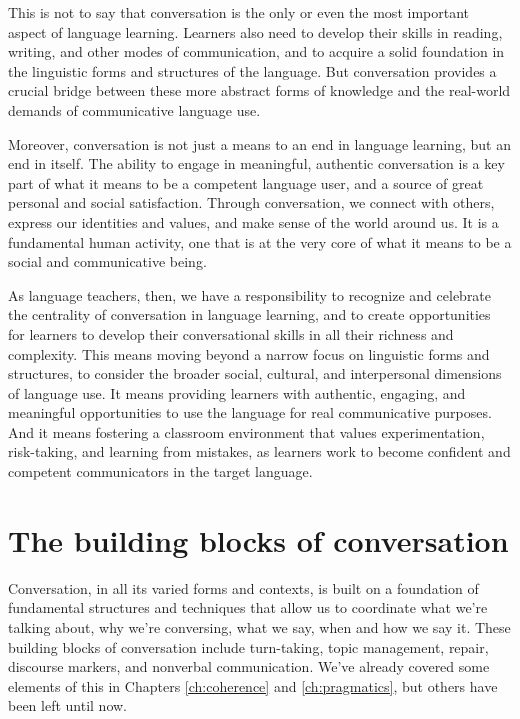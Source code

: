 This is not to say that conversation is the only or even the most important aspect of language learning. Learners also need to develop their skills in reading, writing, and other modes of communication, and to acquire a solid foundation in the linguistic forms and structures of the language. But conversation provides a crucial bridge between these more abstract forms of knowledge and the real-world demands of communicative language use.

Moreover, conversation is not just a means to an end in language learning, but an end in itself. The ability to engage in meaningful, authentic conversation is a key part of what it means to be a competent language user, and a source of great personal and social satisfaction. Through conversation, we connect with others, express our identities and values, and make sense of the world around us. It is a fundamental human activity, one that is at the very core of what it means to be a social and communicative being.

As language teachers, then, we have a responsibility to recognize and celebrate the centrality of conversation in language learning, and to create opportunities for learners to develop their conversational skills in all their richness and complexity. This means moving beyond a narrow focus on linguistic forms and structures, to consider the broader social, cultural, and interpersonal dimensions of language use. It means providing learners with authentic, engaging, and meaningful opportunities to use the language for real communicative purposes. And it means fostering a classroom environment that values experimentation, risk-taking, and learning from mistakes, as learners work to become confident and competent communicators in the target language.

\section{The building blocks of conversation}

Conversation, in all its varied forms and contexts, is built on a foundation of fundamental structures and techniques that allow us to coordinate what we're talking about, why we're conversing, what we say, when and how we say it. These building blocks of conversation include turn-taking, topic management, repair, discourse markers, and nonverbal communication. We've already covered some elements of this in Chapters \ref{ch:coherence} and \ref{ch:pragmatics}, but others have been left until now.

